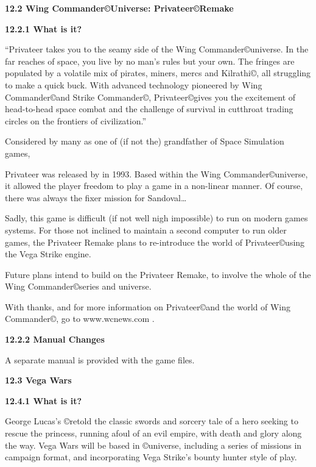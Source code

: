 \documentclass{article}
\begin{document}
\textbf{}

\textbf{}

\textbf{}

\textbf{}

\textbf{12.2 Wing Commander\copyright  Universe: Privateer\copyright  Remake }

\textbf{12.2.1 What is it? }

``Privateer takes you to the seamy side of the Wing Commander\copyright  universe. In the far reaches of space, you live by no man's rules but your own. The fringes are populated by a volatile mix of pirates, miners, mercs and Kilrathi\copyright , all struggling to make a quick buck. With advanced technology pioneered by Wing Commander\copyright  and Strike Commander\copyright , Privateer\copyright  gives you the excitement of head-to-head space combat and the challenge of survival in cutthroat trading circles on the frontiers of civilization.'' 

Considered by many as one of (if not the) grandfather of Space Simulation games, 

Privateer was released by in 1993. Based within the Wing Commander\copyright  universe, it allowed the player freedom to play a game in a non-linear manner. Of course, there was always the fixer mission for Sandoval\dots  





Sadly, this game is difficult (if not well nigh impossible) to run on modern games systems. For those not inclined to maintain a second computer to run older games, the Privateer Remake plans to re-introduce the world of Privateer\copyright  using the Vega Strike engine. 

Future plans intend to build on the Privateer Remake, to involve the whole of the Wing Commander\copyright  series and universe. 

With thanks, and for more information on Privateer\copyright  and the world of Wing Commander\copyright , go to www.wcnews.com . 

\textbf{12.2.2 Manual Changes }

A separate manual is provided with the game files. 

\textbf{}

\textbf{}

\textbf{12.3 Vega Wars }

\textbf{12.4.1 What is it? }

George Lucas's \copyright  retold the classic swords and sorcery tale of a hero seeking to rescue the princess, running afoul of an evil empire, with death and glory along the way. Vega Wars will be based in \copyright  universe, including a series of missions in campaign format, and incorporating Vega Strike's bounty hunter style of play. 
\end{document}
